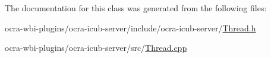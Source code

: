 \-The documentation for this class was generated from the following files\-:\begin{DoxyCompactItemize}
\item 
ocra-\/wbi-\/plugins/ocra-\/icub-\/server/include/ocra-\/icub-\/server/\hyperlink{Thread_8h}{\-Thread.\-h}\item 
ocra-\/wbi-\/plugins/ocra-\/icub-\/server/src/\hyperlink{Thread_8cpp}{\-Thread.\-cpp}\end{DoxyCompactItemize}
